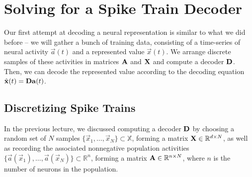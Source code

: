 \documentclass[10pt,letterpaper,oneside]{article}
\begin{document}
\section{Solving for a Spike Train Decoder}

Our first attempt at decoding a neural representation is similar to what we did before -- we will gather a bunch of training data, consisting of a time-series of neural activity $\vec a(t)$ and a represented value $\vec x(t)$. We arrange discrete samples of these activities in matrices ${\mathbf{A}}$ and ${\mathbf{X}}$ and compute a decoder ${\mathbf{D}}$. Then, we can decode the represented value according to the decoding equation $\hat{{\mathbf{x}}}(t) = {\mathbf{D}} {\mathbf{a}}(t)$.


\subsection{Discretizing Spike Trains}

In the previous lecture, we discussed computing a decoder ${\mathbf{D}}$ by choosing a random set of $N$ samples $\big\{ \vec x_1, \ldots, \vec x_N \big\} \subset \mathbb{X}$, forming a matrix ${\mathbf{X}} \in \mathbb{R}^{d \times N}$, as well as recording the associated nonnegative population activities $\big\{ \vec a(\vec x_1), \ldots, \vec a(\vec x_N) \big\} \subset \mathbb{R}^n$, forming a matrix ${\mathbf{A}} \in \mathbb{R}^{n \times N}$, where $n$ is the number of neurons in the population.
\end{document}
